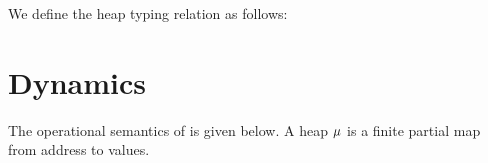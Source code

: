 \documentclass[10pt]{scrartcl}
\begin{document}

We define the heap typing relation as follows:

\begin{mathparpagebreakable}
\end{mathparpagebreakable}

\section{Dynamics}
\label{sec:dynamics}
The operational semantics of \miniML{} is given below. A heap $\heap$ is a finite partial map from address to values.
\end{document}
